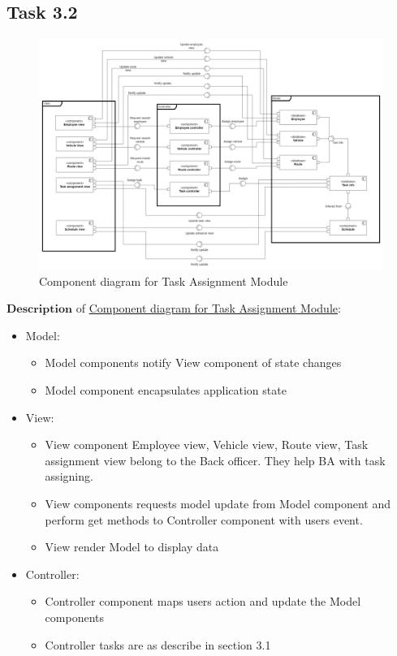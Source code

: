 \documentclass[a4paper]{article}
\begin{document}
\subsection{Task 3.2}
\hypertarget{component}{
\begin{figure}
\hspace{-3cm}
  \includegraphics[width=1.4\linewidth]{component.png}
  \caption{Component diagram for Task Assignment Module}
\end{figure}}


$\textbf{Description}$ of \hyperlink{component}{Component diagram for Task Assignment Module}: 
\begin{itemize}
    \item Model:
    \begin{itemize}
        \item Model components notify View component of state changes
        \item Model component encapsulates application state    
    \end{itemize}

    \item View:
    \begin{itemize}
        \item View component Employee view, Vehicle view, Route view, Task assignment view belong to the Back officer. They help BA with task assigning.
        \item View components requests model update from Model component and perform get methods to Controller component with users event.
        \item View render Model to display data
    \end{itemize}

    \item Controller:
    \begin{itemize}
        \item Controller component maps users action and update the Model components
        \item Controller tasks are as describe in section 3.1
    \end{itemize}
\end{itemize}
\end{document}
